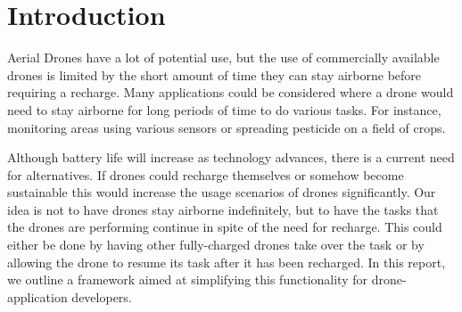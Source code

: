 \section{Introduction}
Aerial Drones have a lot of potential use, but the use of commercially available drones is limited by the short amount of time they can stay airborne before requiring a recharge. Many applications could be considered where a drone would need to stay airborne for long periods of time to do various tasks. For instance, monitoring areas using various sensors or spreading pesticide on a field of crops.

Although battery life will increase as technology advances, there is a current need for alternatives. If drones could recharge themselves or somehow become sustainable this would increase the usage scenarios of drones significantly. Our idea is not to have drones stay airborne indefinitely, but to have the tasks that the drones are performing continue in spite of the need for recharge. This could either be done by having other fully-charged drones take over the task or by allowing the drone to resume its task after it has been recharged. In this report, we outline a framework aimed at simplifying this functionality for drone-application developers.
